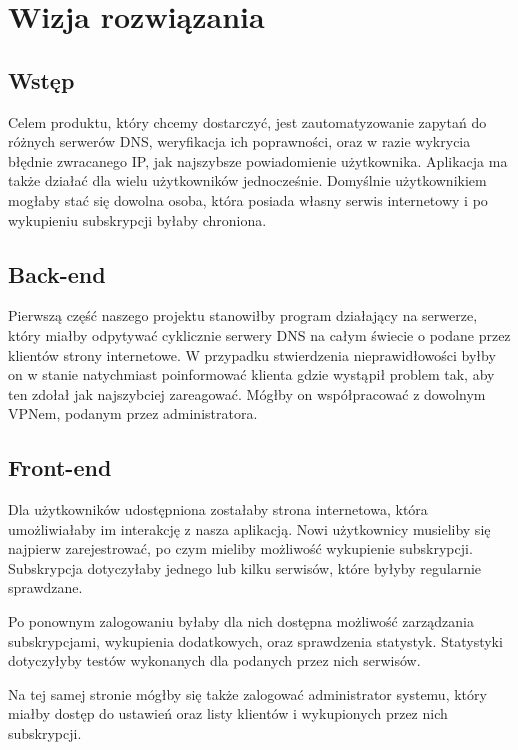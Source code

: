 \section{Wizja rozwiązania}

\subsection{Wstęp}

\hspace{0.5cm} Celem produktu, który chcemy dostarczyć, jest zautomatyzowanie zapytań do różnych serwerów DNS, weryfikacja ich poprawności, oraz w razie wykrycia błędnie zwracanego IP, jak najszybsze powiadomienie użytkownika. Aplikacja ma także działać dla wielu użytkowników jednocześnie. Domyślnie użytkownikiem mogłaby stać się dowolna osoba, która posiada własny serwis internetowy i po wykupieniu subskrypcji byłaby chroniona. 

\subsection{Back-end}

\hspace{0.5cm} Pierwszą część naszego projektu stanowiłby program działający na serwerze, który miałby odpytywać cyklicznie serwery DNS na całym świecie o podane przez klientów strony internetowe. W przypadku stwierdzenia nieprawidłowości byłby on w stanie natychmiast poinformować klienta gdzie wystąpił problem tak, aby ten zdołał jak najszybciej zareagować. Mógłby on współpracować z dowolnym VPNem, podanym przez administratora.

\subsection{Front-end}

\hspace{0.5cm} Dla użytkowników udostępniona zostałaby strona internetowa, która umożliwiałaby im interakcję z nasza aplikacją. Nowi użytkownicy musieliby się najpierw zarejestrować, po czym mieliby możliwość wykupienie subskrypcji. Subskrypcja dotyczyłaby jednego lub kilku serwisów, które byłyby regularnie sprawdzane.

Po ponownym zalogowaniu byłaby dla nich dostępna możliwość zarządzania subskrypcjami, wykupienia dodatkowych, oraz sprawdzenia statystyk. Statystyki dotyczyłyby testów wykonanych dla podanych przez nich serwisów.

Na tej samej stronie mógłby się także zalogować administrator systemu, który miałby dostęp do ustawień oraz listy klientów i wykupionych przez nich subskrypcji.